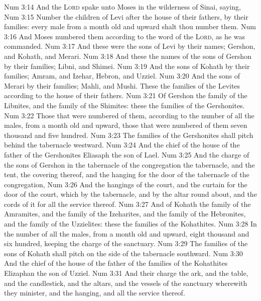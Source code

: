 \vs Num 3:14 And the \textsc{Lord} spake unto Moses in the wilderness of Sinai, saying,
\vs Num 3:15 Number the children of Levi after the house of their fathers, by their families: every male from a month old and upward shalt thou number them.
\vs Num 3:16 And Moses numbered them according to the word of the \textsc{Lord}, as he was commanded.
\vs Num 3:17 And these were the sons of Levi by their names; Gershon, and Kohath, and Merari.
\vs Num 3:18 And these  the names of the sons of Gershon by their families; Libni, and Shimei.
\vs Num 3:19 And the sons of Kohath by their families; Amram, and Izehar, Hebron, and Uzziel.
\vs Num 3:20 And the sons of Merari by their families; Mahli, and Mushi. These  the families of the Levites according to the house of their fathers.
\vs Num 3:21 Of Gershon  the family of the Libnites, and the family of the Shimites: these  the families of the Gershonites.
\vs Num 3:22 Those that were numbered of them, according to the number of all the males, from a month old and upward,  those that were numbered of them  seven thousand and five hundred.
\vs Num 3:23 The families of the Gershonites shall pitch behind the tabernacle westward.
\vs Num 3:24 And the chief of the house of the father of the Gershonites  Eliasaph the son of Lael.
\vs Num 3:25 And the charge of the sons of Gershon in the tabernacle of the congregation  the tabernacle, and the tent, the covering thereof, and the hanging for the door of the tabernacle of the congregation,
\vs Num 3:26 And the hangings of the court, and the curtain for the door of the court, which  by the tabernacle, and by the altar round about, and the cords of it for all the service thereof.
\vs Num 3:27 And of Kohath  the family of the Amramites, and the family of the Izeharites, and the family of the Hebronites, and the family of the Uzzielites: these  the families of the Kohathites.
\vs Num 3:28 In the number of all the males, from a month old and upward,  eight thousand and six hundred, keeping the charge of the sanctuary.
\vs Num 3:29 The families of the sons of Kohath shall pitch on the side of the tabernacle southward.
\vs Num 3:30 And the chief of the house of the father of the families of the Kohathites  Elizaphan the son of Uzziel.
\vs Num 3:31 And their charge  the ark, and the table, and the candlestick, and the altars, and the vessels of the sanctuary wherewith they minister, and the hanging, and all the service thereof.

